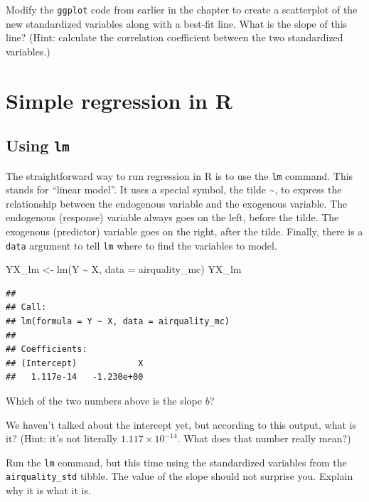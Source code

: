 \documentclass[
]{book}
\newenvironment{Shaded}{\begin{snugshade}}{\end{snugshade}}
\newcommand{\AttributeTok}[1]{\textcolor[rgb]{0.77,0.63,0.00}{#1}}
\newcommand{\FunctionTok}[1]{\textcolor[rgb]{0.00,0.00,0.00}{#1}}
\newcommand{\NormalTok}[1]{#1}
\newcommand{\OtherTok}[1]{\textcolor[rgb]{0.56,0.35,0.01}{#1}}
\newcommand{\SpecialCharTok}[1]{\textcolor[rgb]{0.00,0.00,0.00}{#1}}
\begin{document}
Modify the \texttt{ggplot} code from earlier in the chapter to create a scatterplot of the new standardized variables along with a best-fit line. What is the slope of this line? (Hint: calculate the correlation coefficient between the two standardized variables.)

\hypertarget{simple-r}{%
\section{Simple regression in R}\label{simple-r}}

\hypertarget{simple-r-lm}{%
\subsection{\texorpdfstring{Using \texttt{lm}}{Using lm}}\label{simple-r-lm}}

The straightforward way to run regression in R is to use the \texttt{lm} command. This stands for ``linear model''. It uses a special symbol, the tilde \textasciitilde, to express the relationship between the endogenous variable and the exogenous variable. The endogenous (response) variable always goes on the left, before the tilde. The exogenous (predictor) variable goes on the right, after the tilde. Finally, there is a \texttt{data} argument to tell \texttt{lm} where to find the variables to model.

\begin{Shaded}
\begin{Highlighting}[]
\NormalTok{YX\_lm }\OtherTok{\textless{}{-}} \FunctionTok{lm}\NormalTok{(Y }\SpecialCharTok{\textasciitilde{}}\NormalTok{ X, }\AttributeTok{data =}\NormalTok{ airquality\_mc)}
\NormalTok{YX\_lm}
\end{Highlighting}
\end{Shaded}

\begin{verbatim}
## 
## Call:
## lm(formula = Y ~ X, data = airquality_mc)
## 
## Coefficients:
## (Intercept)            X  
##   1.117e-14   -1.230e+00
\end{verbatim}

Which of the two numbers above is the slope \(b\)?

We haven't talked about the intercept yet, but according to this output, what is it? (Hint: it's not literally \(1.117 \times 10^{-14}\). What does that number really mean?)

Run the \texttt{lm} command, but this time using the standardized variables from the \texttt{airquality\_std} tibble. The value of the slope should not surprise you. Explain why it is what it is.
\end{document}
